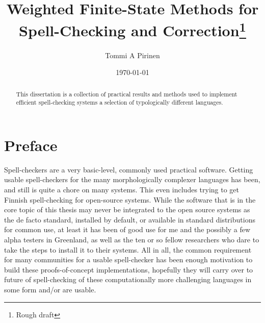 \documentclass[officiallayout,draft]{unihelcompling}
\title{Weighted Finite-State Methods for 
Spell-Checking
and Correction\footnote{Rough draft}}
\author{Tommi A Pirinen}
\date{\today}
\begin{document}
\frontmatter

\maketitle

\begin{abstract}
    This dissertation is a collection of practical results and methods used
    to implement efficient spell-checking systems a selection of typologically
    different languages.
\end{abstract}

\tableofcontents

\listoftodos

\mainmatter

\chapter*{Preface}
\label{chap:preface}

Spell-checkers are a very basic-level, commonly used practical software.
Getting usable spell-checkers for the many morphologically complexer languages
has been, and still is quite a chore on many systems. This even includes trying
to get Finnish spell-checking for open-source systems. While the software that
is in the core topic of this thesis may never be integrated to the open source
systems as the de facto standard, installed by default, or available in
standard distributions for common use, at least it has been of good use for me
and the possibly a few alpha testers in Greenland, as well as the ten or so
fellow researchers who dare to take the steps to install it to their systems.
All in all, the common requirement for many communities for a usable
spell-checker has been enough motivation to build these proofs-of-concept
implementations, hopefully they will carry over to future of spell-checking of
these computationally more challenging languages in some form and/or are
usable.
\end{document}
